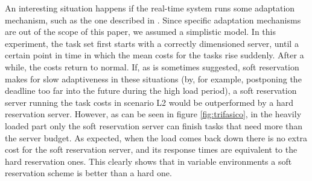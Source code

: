 \documentclass[times, 10pt,twocolumn]{article}
\begin{document}
An interesting situation happens if the real-time system runs some
adaptation mechanism, such as the one described in
\cite{abeni.ea05:qos}. Since specific adaptation mechanisms are out of
the scope of this paper, we assumed a simplistic model. In this
experiment, the task set first starts with a correctly dimensioned
server, until a certain point in time in which the mean costs for the
tasks rise suddenly. After a while, the costs return to normal. If, as
is sometimes suggested, soft reservation makes for slow adaptiveness
in these situations (by, for example, postponing the deadline too far
into the future during the high load period), a soft reservation
server running the task costs in scenario L2 would be outperformed by
a hard reservation server. However, as can be seen in figure
\ref{fig:trifasico}, in the heavily loaded part only the soft
reservation server can finish tasks that need more than the server
budget. As expected, when the load comes back down there is no extra
cost for the soft reservation server, and its response times are
equivalent to the hard reservation ones. This clearly shows that in
variable environments a soft reservation scheme is better than a hard
one.
\end{document}

